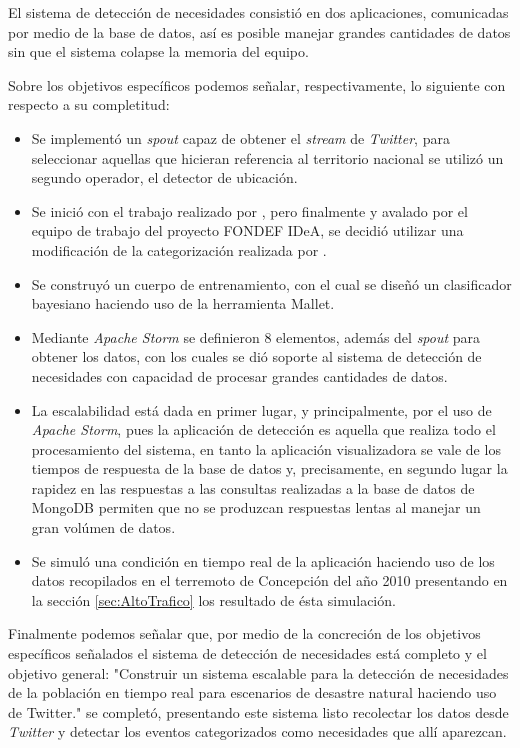 El sistema de detección de necesidades consistió en dos aplicaciones, comunicadas por medio de la base de datos, así es posible manejar grandes cantidades de datos sin que el sistema colapse la memoria del equipo.

Sobre los objetivos específicos podemos señalar, respectivamente, lo siguiente con respecto a su completitud:

\begin{itemize}
\item Se implementó un \textit{spout} capaz de obtener el \textit{stream} de \textit{Twitter}, para seleccionar aquellas que hicieran referencia al territorio nacional se utilizó un segundo operador, el detector de ubicación.
\item Se inició con el trabajo realizado por \cite{TaxonomiaChato}, pero finalmente y avalado por el equipo de trabajo del proyecto FONDEF IDeA, se decidió utilizar una modificación de la categorización realizada por \cite{Alvarado}.
\item Se construyó un cuerpo de entrenamiento, con el cual se diseñó un clasificador bayesiano haciendo uso de la herramienta Mallet.
\item Mediante \textit{Apache Storm} se definieron 8 elementos, además del \textit{spout} para obtener los datos, con los cuales se dió soporte al sistema de detección de necesidades con capacidad de procesar grandes cantidades de datos.
\item La escalabilidad está dada en primer lugar, y principalmente, por el uso de \textit{Apache Storm}, pues la aplicación de detección es aquella que realiza todo el procesamiento del sistema, en tanto la aplicación visualizadora se vale de los tiempos de respuesta de la base de datos y, precisamente, en segundo lugar la rapidez en las respuestas a las consultas realizadas a la base de datos de MongoDB permiten que no se produzcan respuestas lentas al manejar un gran volúmen de datos.
\item Se simuló una condición en tiempo real de la aplicación haciendo uso de los datos recopilados en el terremoto de Concepción del año 2010 presentando en la sección \ref{sec:AltoTrafico} los resultado de ésta simulación.
\end{itemize}

Finalmente podemos señalar que, por medio de la concreción de los objetivos específicos señalados el sistema de detección de necesidades está completo y el objetivo general: "Construir un sistema escalable para la detección de necesidades de la población en tiempo real para escenarios de desastre natural haciendo uso de Twitter." se completó, presentando este sistema listo recolectar los datos desde \textit{Twitter} y detectar los eventos categorizados como necesidades que allí aparezcan.

